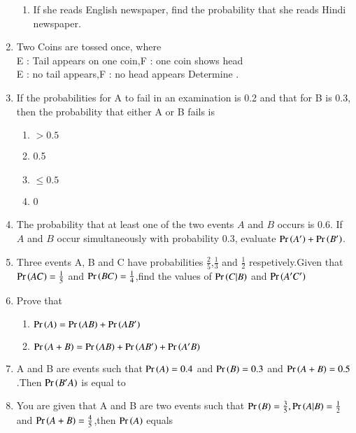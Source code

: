 \begin{enumerate}[resume*]
\begin{enumerate}
\item If she reads English newspaper, find the probability that she reads Hindi
newspaper.
\end{enumerate}
\solution

%
\item Two Coins are tossed once, where\\
 E : Tail appears on one coin,\qquad F : one coin shows head\\
  E : no tail appears,\qquad\qquad\qquad F : no head appears
Determine .

%
\item If the probabilities for A to fail in an examination is 0.2 and that for B is 0.3, then
the probability that either A or B fails is
\begin{enumerate}
\item $>0.5$
\item 0.5
\item $\le 0.5$
\item 0
\end{enumerate}
\solution

\item The probability that at least one of the two events $A$ and $B$ occurs is 0.6. If $A$ and $B$ occur simultaneously with probability 0.3, evaluate $\Pr\left(A^\prime\right) + \Pr\left(B^\prime\right)$.\\
\solution

\item Three events A, B and C have probabilities $\frac{2}{5}$,$\frac{1}{3}$ and $\frac{1}{2}$ respetively.Given that $\Pr\left(AC\right)=\frac{1}{5}$ and $\Pr\left(BC\right)=\frac{1}{4}$,find the values of $\Pr\left(C | B\right)$ and $\Pr\left(A^{\prime} C^{\prime}\right)$\\
\solution

\item Prove that
	\begin{enumerate}
	\item $\Pr\left(A\right) = \Pr\left(AB\right) + \Pr\left(AB^\prime\right)$
	\item $\Pr\left(A+B\right) = \Pr\left(AB\right) + \Pr\left(AB^\prime\right) + \Pr\left(A^\prime B\right)$
	\end{enumerate}

\item A and B are events such that $\Pr\left(A\right) = 0.4$ and $\Pr\left(B\right) = 0.3$ and $\Pr\left(A+B\right) = 0.5$ .Then $\Pr\left(B^\prime A\right)$ is equal to\\
\solution

\item You are given that A and B are two events such that $\Pr\left(B\right)=\frac{3}{5},\Pr\left(A|B\right)=\frac{1}{2}$ and $\Pr\left(A+B\right)=\frac{4}{5}$,then $\Pr\left(A\right)$ equals\\

\end{enumerate}
